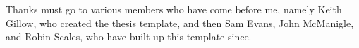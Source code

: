 Thanks must go to various  members who have come before me, namely Keith Gillow, who created the  thesis template, and then Sam Evans, John McManigle, and Robin Scales, who have built up this template since.